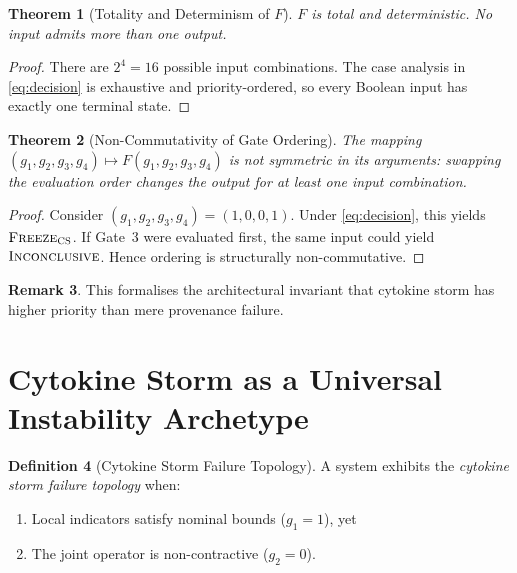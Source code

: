 \documentclass[11pt,a4paper]{article}
\theoremstyle{tealstyle}
\newtheorem{theorem}{Theorem}[section]
\theoremstyle{definition}
\newtheorem{definition}[theorem]{Definition}
\newtheorem{remark}[theorem]{Remark}
\newcommand{\F}{F}
\newcommand{\freezecs}{\textsc{Freeze\textsubscript{CS}}}
\newcommand{\inconclusive}{\textsc{Inconclusive}}
\begin{document}
\begin{theorem}[Totality and Determinism of $\F$]
\label{thm:total}
$\F$ is total and deterministic.
No input admits more than one output.
\end{theorem}

\begin{proof}
There are $2^4 = 16$ possible input combinations.
The case analysis in \eqref{eq:decision} is exhaustive and priority-ordered,
so every Boolean input has exactly one terminal state.
\end{proof}

\begin{theorem}[Non-Commutativity of Gate Ordering]
\label{thm:noncommute}
The mapping $(g_1,g_2,g_3,g_4) \mapsto \F(g_1,g_2,g_3,g_4)$ is
not symmetric in its arguments: swapping the evaluation order
changes the output for at least one input combination.
\end{theorem}

\begin{proof}
Consider $(g_1,g_2,g_3,g_4) = (1,0,0,1)$.
Under \eqref{eq:decision}, this yields $\freezecs$.
If Gate~3 were evaluated first, the same input could yield
$\inconclusive$.
Hence ordering is structurally non-commutative.
\end{proof}

\begin{remark}
This formalises the architectural invariant that cytokine storm has higher
priority than mere provenance failure.
\end{remark}

\section{Cytokine Storm as a Universal Instability Archetype}
\label{sec:cytokine}

\begin{definition}[Cytokine Storm Failure Topology]
\label{def:cytokine}
A system exhibits the \emph{cytokine storm failure topology} when:
\begin{enumerate}[label=(\roman*)]
  \item Local indicators satisfy nominal bounds ($g_1 = 1$), yet
  \item The joint operator is non-contractive ($g_2 = 0$).
\end{enumerate}
\end{definition}
\end{document}
